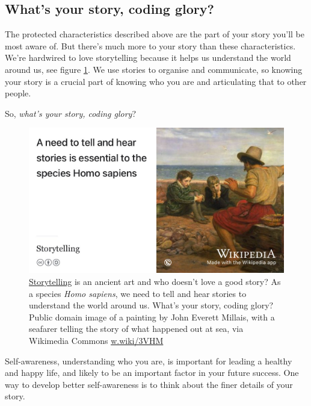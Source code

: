\documentclass[
]{book}
\begin{document}
\hypertarget{story}{%
\subsection{What's your story, coding glory?}\label{story}}

The protected characteristics described above are the part of your story you'll be most aware of. But there's much more to your story than these characteristics. We're hardwired to love storytelling because it helps us understand the world around us, see figure \ref{fig:storytelling-fig}. We use stories to organise and communicate, so knowing your story is a crucial part of knowing who you are and articulating that to other people.

So, \emph{what's your story, coding glory}? \citep{whatsthestory}

\begin{figure}

{\centering \includegraphics[width=1\linewidth]{images/storytelling} 

}

\caption{\href{https://en.wikipedia.org/wiki/Storytelling}{Storytelling} is an ancient art and who doesn't love a good story? As a species \emph{Homo sapiens}, we need to tell and hear stories to understand the world around us. What's your story, coding glory? Public domain image of a painting by John Everett Millais, with a seafarer telling the story of what happened out at sea, via Wikimedia Commons \href{https://w.wiki/3VHM}{w.wiki/3VHM}}\label{fig:storytelling-fig}
\end{figure}



Self-awareness, understanding who you are, is important for leading a healthy and happy life, and likely to be an important factor in your future success. One way to develop better self-awareness is to think about the finer details of your story. \citep{freeyourstory}
\end{document}
